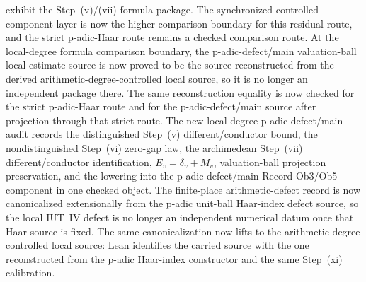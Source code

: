 \documentclass[11pt]{article}
\theoremstyle{plain}
\theoremstyle{definition}
\theoremstyle{remark}
\begin{document}
exhibit the Step~(v)/(vii) formula package.
The synchronized controlled component layer is now the higher comparison
boundary for this residual route, and the strict p-adic-Haar route remains a
checked comparison route.  At the local-degree
formula comparison boundary, the p-adic-defect/main valuation-ball local-estimate
source is now proved to be the source reconstructed from the derived
arithmetic-degree-controlled local source, so it is no longer an independent
package there.  The same reconstruction equality is now checked for the strict
p-adic-Haar route and for the p-adic-defect/main source after projection through
that strict route.  The new local-degree p-adic-defect/main audit records the
distinguished Step~(v) different/conductor bound, the nondistinguished
Step~(vi) zero-gap law, the archimedean Step~(vii) different/conductor
identification, \(E_v=\delta_v+M_v\), valuation-ball projection preservation,
and the lowering into the p-adic-defect/main Record-Ob3/Ob5 component in one
checked object.  The finite-place arithmetic-defect record is now canonicalized
extensionally from the p-adic unit-ball Haar-index defect source, so the local
IUT~IV defect is no longer an independent numerical datum once that Haar source
is fixed.  The same canonicalization now lifts to the arithmetic-degree
controlled local source: Lean identifies the carried source with the one
reconstructed from the p-adic Haar-index constructor and the same Step~(xi)
calibration.
\end{document}
